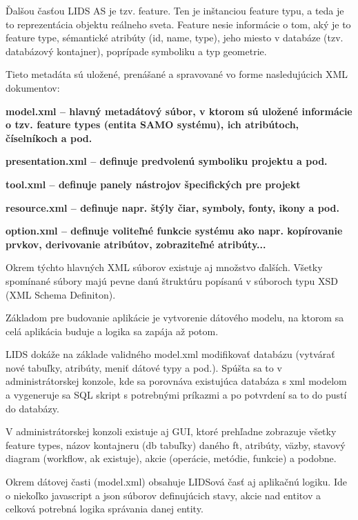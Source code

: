 Ďalšou časťou LIDS AS je tzv. feature. Ten je inštanciou feature typu, a teda je to reprezentácia objektu reálneho sveta. Feature nesie informácie o tom, aký je to feature type, sémantické atribúty (id, name, type), jeho miesto v databáze (tzv. databázový kontajner), poprípade symboliku a typ geometrie.

Tieto metadáta sú uložené, prenášané a spravované vo forme nasledujúcich XML dokumentov:

\startitemize
\item{\start \bf model.xml \stop -- hlavný metadátový súbor, v ktorom sú uložené informácie o tzv. feature types (entita SAMO systému), ich atribútoch, číselníkoch a pod.}
\item{\start \bf presentation.xml \stop -- definuje predvolenú symboliku projektu a pod.}
\item{\start \bf tool.xml \stop -- definuje panely nástrojov špecifických pre projekt}
\item{\start \bf resource.xml \stop -- definuje napr. štýly čiar, symboly, fonty, ikony a pod.}
\item{\start \bf option.xml \stop -- definuje voliteľné funkcie systému ako napr. kopírovanie prvkov, derivovanie atribútov, zobraziteľné atribúty...}
\stopitemize 

Okrem týchto hlavných XML súborov existuje aj množstvo ďalších. Všetky spomínané súbory majú pevne danú štruktúru popísanú v súboroch typu XSD (XML Schema Definiton). 

Základom pre budovanie aplikácie je vytvorenie dátového modelu, na ktorom sa celá aplikácia buduje a logika sa zapája až potom. 

LIDS dokáže na základe validného model.xml modifikovať databázu (vytvárať nové tabuľky, atribúty, meniť dátové typy a pod.). Spúšta sa to v administrátorskej konzole, kde sa porovnáva existujúca databáza s xml modelom a vygeneruje sa SQL skript s potrebnými príkazmi a po potvrdení sa to do pustí do databázy.

V administrátorskej konzoli existuje aj GUI, ktoré prehľadne zobrazuje všetky feature types, názov kontajneru (db tabuľky) daného ft, atribúty, väzby, stavový diagram (workflow, ak existuje), akcie (operácie, metódie, funkcie) a podobne. 

Okrem dátovej časti (model.xml) obsahuje LIDSová časť aj aplikačnú logiku. Ide o niekoľko javascript a json súborov definujúcich stavy, akcie nad entitov a celková potrebná logika správania danej entity.

